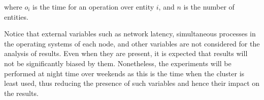 \noindent where $o_i$ is the time for an operation over entity $i$,  and  $n$ is
the number of entities. 


Notice that external variables such as network latency,   simultaneous processes
in the operating systems of each node,   and other variables are not considered
for the analysis of results.   Even when they are present,   it is expected that
results will not be significantly biased by them.   Nonetheless,   the
experiments will be  performed at night time over weekends as this is the time
 when the cluster is least used,   thus reducing the presence of such variables
and hence their impact on the results.  





  








